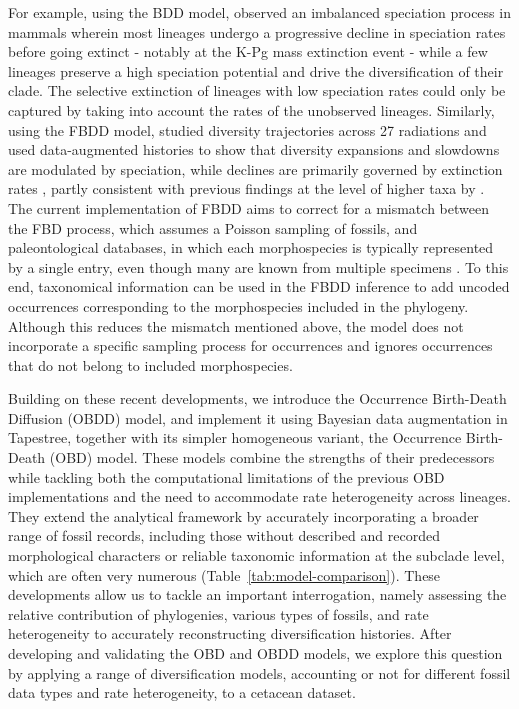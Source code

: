 \documentclass[oupdraft]{sysbio}
\newcommand{\revised}[1]{{\color{blue} #1}}
\begin{document}
For example, using the BDD model, \citet{quintero_imbalanced_2024} observed an imbalanced speciation process in mammals wherein most lineages undergo a progressive decline in speciation rates before going extinct - notably at the K-Pg mass extinction event - while a few lineages preserve a high speciation potential and drive the diversification of their clade. The selective extinction of lineages with low speciation rates could only be captured by taking into account the rates of the unobserved lineages. Similarly, using the FBDD model, \citet{quintero_loss_2025} studied diversity trajectories across 27 radiations and used data-augmented histories to show that diversity expansions and slowdowns are modulated by speciation, while declines are primarily governed by extinction rates\revised{, partly consistent with previous findings at the level of higher taxa by \citet{gilinsky_asymmetrical_1987}}. The current implementation of FBDD aims to correct for a mismatch between the FBD process, which assumes a Poisson sampling of fossils, and paleontological databases, in which \revised{each morphospecies is typically represented by a single entry, even though many are known from multiple specimens} \citep{wright_integrating_2022}. To this end, taxonomical information can be used in the FBDD inference to add \revised{uncoded} occurrences corresponding to the morphospecies included in the phylogeny. Although this reduces the mismatch mentioned above, the model does not incorporate a specific sampling process for occurrences and ignores occurrences that do not belong to included morphospecies.

Building on these recent developments, we introduce the Occurrence Birth-Death Diffusion (OBDD) model, and implement it \revised{using Bayesian data augmentation} in Tapestree, together with its simpler homogeneous variant, the Occurrence Birth-Death (OBD) model. These models combine the strengths of their predecessors while tackling both the computational limitations of the previous OBD implementations and the need to accommodate rate heterogeneity across lineages. They extend the analytical framework by accurately incorporating a broader range of fossil records, including those without described and recorded morphological characters or reliable taxonomic information at the subclade level, which are often very numerous \revised{(Table~\ref{tab:model-comparison})}. These developments allow us to tackle an important interrogation, namely assessing the relative contribution of phylogenies, various types of fossils, and rate heterogeneity to accurately reconstructing diversification histories. After developing and validating the OBD and OBDD models, we explore this question by applying a range of diversification models, accounting or not for different fossil data types and rate heterogeneity, to a cetacean dataset.
\end{document}
